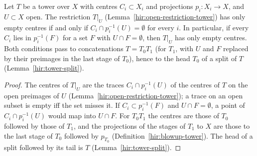 \begin{lemma}
\label{bcalc:restrict-empty-tower}
\mixedleanok
Let \(T\) be a tower over \(X\) with centres \(C_i\subset X_i\) and projections \(p_i\colon X_i\to X\), and \(U\subset X\) open. The restriction \(T|_U\)
(Lemma~\ref{hir:open-restriction-tower}) has only empty centres if and only if \(C_i\cap p_i^{-1}(U)=\emptyset\) for every \(i\). In particular, if every
\(C_i\) lies in \(p_i^{-1}(F)\) for a set \(F\) with \(U\cap F=\emptyset\), then \(T|_U\) has only empty centres. Both conditions pass to concatenations
\(T=T_0T_1\) (for \(T_1\), with \(U\) and \(F\) replaced by their preimages in the last stage of \(T_0\)), hence to the head \(T_0\) of a split of \(T\)
(Lemma~\ref{hir:tower-split}).
\end{lemma}
\begin{proof}
\mixedleanok
The centres of \(T|_U\) are the traces \(C_i\cap p_i^{-1}(U)\) of the centres of \(T\) on the open preimages of \(U\) (Lemma~\ref{hir:open-restriction-tower});
a trace on an open subset is empty iff the set misses it. If \(C_i\subset p_i^{-1}(F)\) and \(U\cap F=\emptyset\), a point of \(C_i\cap p_i^{-1}(U)\) would map into
\(U\cap F\). For \(T_0T_1\) the centres are those of \(T_0\) followed by those of \(T_1\), and the projections of the stages of \(T_1\) to \(X\) are those to the
last stage of \(T_0\) followed by \(p_{T_0}\) (Definition~\ref{hir:blowup-tower}). The head of a split followed by its tail is \(T\)
(Lemma~\ref{hir:tower-split}).
\end{proof}

